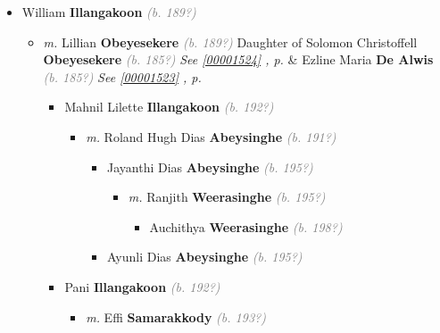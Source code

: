 \documentclass[10pt, openany]{book}
\begin{document}
\begin{itemize}
{\begin{itemize}
{\begin{itemize}
\end{itemize}
   }
\item{William \textbf{Illangakoon} \textcolor{gray}{\textit{(b. 189?)}}
\begin{itemize}
\item{\textit{m.} Lillian \textbf{Obeyesekere} \textcolor{gray}{\textit{(b. 189?)}} Daughter of  Solomon Christoffell \textbf{Obeyesekere} \textcolor{gray}{\textit{(b. 185?)}} \textcolor{slteal}{\textit{See  \autoref{00001524} \textit{, p. \pageref{00001524} }}}  \&  Ezline Maria \textbf{De Alwis} \textcolor{gray}{\textit{(b. 185?)}} \textcolor{slteal}{\textit{See  \autoref{00001523} \textit{, p. \pageref{00001523} }}}   \label{couple:00001465:00001466} \begin{itemize}
\item{Mahnil Lilette \textbf{Illangakoon} \textcolor{gray}{\textit{(b. 192?)}}
\begin{itemize}
\item{\textit{m.} Roland Hugh Dias \textbf{Abeysinghe} \textcolor{gray}{\textit{(b. 191?)}}   \label{couple:00001471:00001472} \begin{itemize}
\item{Jayanthi Dias \textbf{Abeysinghe} \textcolor{gray}{\textit{(b. 195?)}}
\begin{itemize}
\item{\textit{m.} Ranjith \textbf{Weerasinghe} \textcolor{gray}{\textit{(b. 195?)}}   \label{couple:00001474:00001475} \begin{itemize}
\item{Auchithya \textbf{Weerasinghe} \textcolor{gray}{\textit{(b. 198?)}}
 }
\end{itemize}}
\end{itemize}
  }
\item{Ayunli Dias \textbf{Abeysinghe} \textcolor{gray}{\textit{(b. 195?)}}
  }
\end{itemize}}
\end{itemize}
  }
\item{Pani \textbf{Illangakoon} \textcolor{gray}{\textit{(b. 192?)}}
\begin{itemize}
\item{\textit{m.} Effi \textbf{Samarakkody} \textcolor{gray}{\textit{(b. 193?)}}   \label{couple:00001468:00001469} \begin{itemize}

\end{itemize}}
\end{itemize}}
\end{itemize}}
\end{itemize}}
\end{itemize}}
\end{itemize}
\end{document}
